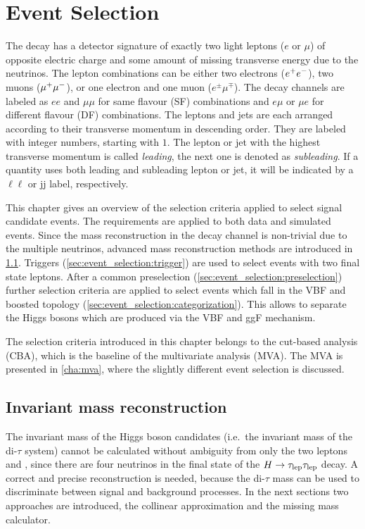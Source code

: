 \chapter{Event Selection}\label{cha:event_selection}

The \Httllfull{} decay has a detector signature of exactly two light leptons ($e$ or $\mu$) of opposite electric
charge and some amount of missing transverse energy due to the neutrinos.
The lepton combinations can be either two electrons ($e^+e^-$), two muons ($\mu^+\mu^-$), or one electron and one muon ($e^\pm \mu^\mp$).
The decay channels are labeled as $ee$ and $\mu\mu$ for same flavour (SF) combinations and $e\mu$ or $\mu e$ for
different flavour (DF) combinations.
The leptons and jets are each arranged according to their transverse momentum in descending order.
They are labeled with integer numbers, starting with $1$.
The lepton or jet with the highest transverse momentum is called \emph{leading},
the next one is denoted as \emph{subleading}.
If a quantity uses both leading and subleading lepton or jet, it will be indicated by a $\ell\ell$ or jj label, respectively.

This chapter gives an overview of the selection criteria applied to select signal candidate events.
The requirements are applied to both data and simulated events.
Since the mass reconstruction in the \Httllfull{} decay channel is non-trivial due to the multiple neutrinos,
advanced mass reconstruction methods are introduced in \cref{sec:event_selection:mass}.
Triggers (\cref{sec:event_selection:trigger}) are used to select events with two final state leptons.
After a common preselection (\cref{sec:event_selection:preselection}) further selection criteria are applied
to select events which fall in the VBF and boosted topology (\cref{sec:event_selection:categorization}).
This allows to separate the Higgs bosons which are produced via the VBF and ggF mechanism.

The selection criteria introduced in this chapter belongs to the cut-based analysis (CBA), which is the baseline
of the multivariate analysis (MVA). The MVA is presented in \cref{cha:mva}, where the slightly different event selection is discussed.

\section{Invariant mass reconstruction}\label{sec:event_selection:mass}

The invariant mass of the Higgs boson candidates (i.e.\ the invariant mass of the di-$\tau$ system)
cannot be calculated without ambiguity from only the two leptons and \etmiss, since there are four neutrinos in the final state of the $H \to \tau_\text{lep} \tau_\text{lep}$ decay.
A correct and precise reconstruction is needed, because the di-$\tau$ mass can be used to discriminate between signal and background processes.
In the next sections two approaches are introduced, the collinear approximation and the missing mass calculator.

